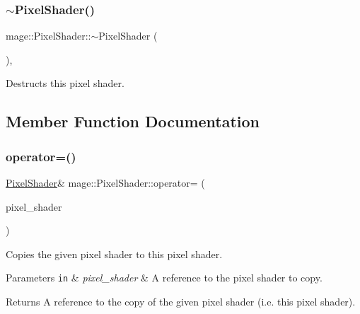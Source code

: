 \subsubsection{\texorpdfstring{$\sim$\+Pixel\+Shader()}{~PixelShader()}}
{\footnotesize\ttfamily mage\+::\+Pixel\+Shader\+::$\sim$\+Pixel\+Shader (\begin{DoxyParamCaption}{ }\end{DoxyParamCaption})\hspace{0.3cm}{\ttfamily [virtual]}, {\ttfamily [default]}}

Destructs this pixel shader. 

\subsection{Member Function Documentation}
\hypertarget{classmage_1_1_pixel_shader_ac3a3535b2751237f4aad110dca05d0c3}{}\label{classmage_1_1_pixel_shader_ac3a3535b2751237f4aad110dca05d0c3} 
\subsubsection{\texorpdfstring{operator=()}{operator=()}\hspace{0.1cm}{\footnotesize\ttfamily [1/2]}}
{\footnotesize\ttfamily \hyperlink{classmage_1_1_pixel_shader}{Pixel\+Shader}\& mage\+::\+Pixel\+Shader\+::operator= (\begin{DoxyParamCaption}\item[{const \hyperlink{classmage_1_1_pixel_shader}{Pixel\+Shader} \&}]{pixel\+\_\+shader }\end{DoxyParamCaption})\hspace{0.3cm}{\ttfamily [delete]}}

Copies the given pixel shader to this pixel shader.


\begin{DoxyParams}[1]{Parameters}
\mbox{\tt in}  & {\em pixel\+\_\+shader} & A reference to the pixel shader to copy. \\
\hline
\end{DoxyParams}
\begin{DoxyReturn}{Returns}
A reference to the copy of the given pixel shader (i.\+e. this pixel shader). 
\end{DoxyReturn}
\hypertarget{classmage_1_1_pixel_shader_aaeab6f6fda7d6e1f7d333da03d58daf9}{}\label{classmage_1_1_pixel_shader_aaeab6f6fda7d6e1f7d333da03d58daf9} 
